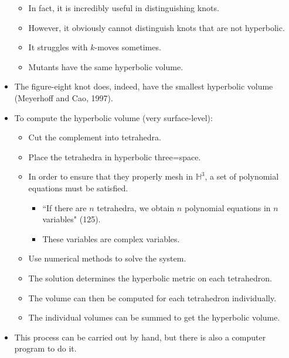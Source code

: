 \documentclass[titlepage]{article}
\numberwithin{figure}{section}
\numberwithin{table}{section}
\numberwithin{equation}{section}
\newcommand{\dq}[2]{``#1" (#2).}
\begin{document}
\begin{itemize}
\begin{itemize}
        \item In fact, it is incredibly useful in distinguishing knots.
        \item However, it obviously cannot distinguish knots that are not hyperbolic.
        \item It struggles with $k$-moves sometimes.
        \item Mutants have the same hyperbolic volume.
    \end{itemize}
    \item The figure-eight knot does, indeed, have the smallest hyperbolic volume (Meyerhoff and Cao, 1997).
    \item To compute the hyperbolic volume (very surface-level):
    \begin{itemize}
        \item Cut the complement into tetrahedra.
        \item Place the tetrahedra in hyperbolic three=space.
        \item In order to ensure that they properly mesh in $\mathbb{H}^3$, a set of polynomial equations must be satisfied.
        \begin{itemize}
            \item \dq{If there are $n$ tetrahedra, we obtain $n$ polynomial equations in $n$ variables}{125}
            \item These variables are complex variables.
        \end{itemize}
        \item Use numerical methods to solve the system.
        \item The solution determines the hyperbolic metric on each tetrahedron.
        \item The volume can then be computed for each tetrahedron individually.
        \item The individual volumes can be summed to get the hyperbolic volume.
    \end{itemize}
    \item This process can be carried out by hand, but there is also a computer program to do it.
\end{itemize}
\end{document}
